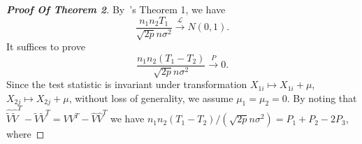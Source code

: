 
\begin{proof}[\textbf{Proof Of Theorem 2}]
    By~\cite{Chen2010A}'s Theorem 1, we have
    \begin{equation*}
        \frac{n_1 n_2 T_1}{\sqrt{2p}n\sigma^2}\xrightarrow{\mathcal{L}}N(0,1).
    \end{equation*}
    It suffices to prove
\begin{equation*}
\frac{n_1n_2(T_1-T_2)}{\sqrt{2p}n\sigma^2}\xrightarrow{P}0.
\end{equation*}
Since the test statistic is invariant under transformation $X_{1i}\mapsto X_{1i}+\mu$, $X_{2j}\mapsto X_{2j}+\mu$, without loss of generality, we assume $\mu_1=\mu_2=0$.
    By noting that $\hat{\tilde{V}}\hat{\tilde{V}}^T -\tilde{V}\tilde{V}^T =VV^T -\hat{V}\hat{V}^T $ we have ${n_1n_2(T_1-T_2)}/{(\sqrt{2p}n\sigma^2)}=P_1+P_2-2P_3$, where


\end{proof}
